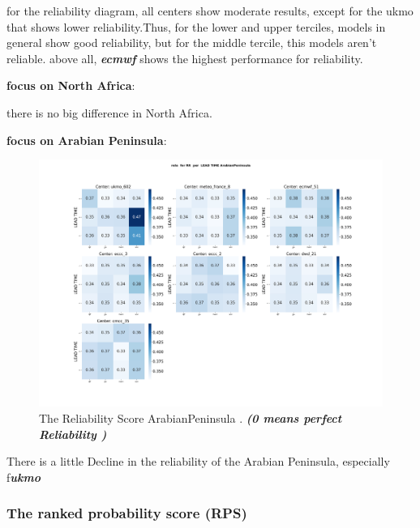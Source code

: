for the reliability diagram, all centers show moderate results, except for the ukmo that shows lower reliability.Thus, for the lower and upper terciles, models in general show good reliability, but for the middle tercile, this models aren't reliable. above all, \textbf{\textit{ecmwf}}  shows the highest performance for reliability.

\vspace{1.5cm}
\textbf{focus on North Africa}:

there is no big difference in North Africa.

\vspace{1.5cm}
\textbf{focus on Arabian Peninsula}:

\begin{figure}[H]
    \centering
    \includegraphics[scale=0.25]{plots/prob/rela/rela_RR_ArabianPeninsula.png}
    \caption{The Reliability Score ArabianPeninsula . \textbf{\textit{(0 means perfect Reliability )}}}
\end{figure}

There is a little Decline in the reliability of the Arabian Peninsula, especially f\textbf{\textit{ukmo}}


\subsubsection{The ranked probability score (RPS)}


